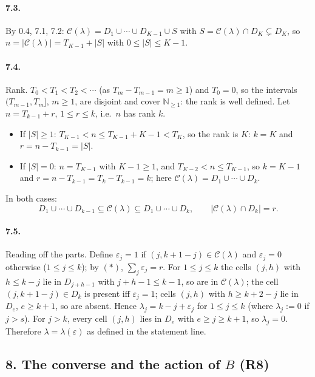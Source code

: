\documentclass[11pt]{article}
\begin{document}
\paragraph{7.3.} By 0.4, 7.1, 7.2: $\mathcal C(\lambda)=D_1\cup\cdots\cup D_{K-1}\cup S$ with
$S=\mathcal C(\lambda)\cap D_K\subsetneq D_K$, so $n=|\mathcal C(\lambda)|=T_{K-1}+|S|$ with $0\le|S|\le K-1$.

\paragraph{7.4.} Rank. $T_0<T_1<T_2<\cdots$ (as $T_m-T_{m-1}=m\ge1$) and $T_0=0$, so the intervals
$(T_{m-1},T_m]$, $m\ge1$, are disjoint and cover $\mathbb N_{\ge1}$: the rank is well defined. Let
$n=T_{k-1}+r$, $1\le r\le k$, i.e.\ $n$ has rank $k$.
\begin{itemize}
\item If $|S|\ge1$: $T_{K-1}<n\le T_{K-1}+K-1<T_K$, so the rank is $K$: $k=K$ and $r=n-T_{k-1}=|S|$.
\item If $|S|=0$: $n=T_{K-1}$ with $K-1\ge1$, and $T_{K-2}<n\le T_{K-1}$, so $k=K-1$ and
$r=n-T_{k-1}=T_k-T_{k-1}=k$; here $\mathcal C(\lambda)=D_1\cup\cdots\cup D_k$.
\end{itemize}
In both cases:
\begin{equation*}
D_1\cup\cdots\cup D_{k-1}\subseteq\mathcal C(\lambda)\subseteq D_1\cup\cdots\cup D_k,\qquad
|\mathcal C(\lambda)\cap D_k|=r.\tag{$*$}
\end{equation*}

\paragraph{7.5.} Reading off the parts. Define $\varepsilon_j=1$ if $(j,k+1-j)\in\mathcal C(\lambda)$ and
$\varepsilon_j=0$ otherwise ($1\le j\le k$); by $(*)$, $\sum_j\varepsilon_j=r$. For $1\le j\le k$ the cells $(j,h)$
with $h\le k-j$ lie in $D_{j+h-1}$ with $j+h-1\le k-1$, so are in $\mathcal C(\lambda)$; the cell
$(j,k+1-j)\in D_k$ is present iff $\varepsilon_j=1$; cells $(j,h)$ with $h\ge k+2-j$ lie in $D_e$, $e\ge k+1$, so
are absent. Hence $\lambda_j=k-j+\varepsilon_j$ for $1\le j\le k$ (where $\lambda_j:=0$ if $j>s$). For $j>k$, every
cell $(j,h)$ lies in $D_e$ with $e\ge j\ge k+1$, so $\lambda_j=0$. Therefore $\lambda=\lambda(\varepsilon)$ as
defined in the statement line.

\subsection*{8. The converse and the action of $B$ (R8)}
\end{document}
